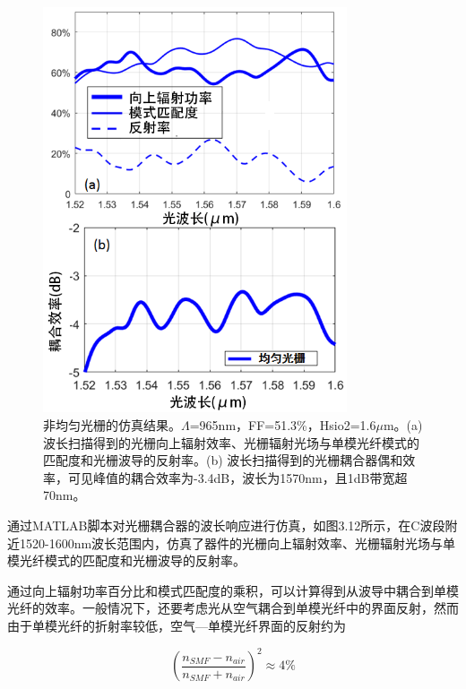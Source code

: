 \begin{figure}[!htbp]
    \centering
    \includegraphics[width=0.8\textwidth]{Img/3-12.png}
    \caption{非均匀光栅的仿真结果。$\Lambda$=965nm，FF=51.3\%，Hsio2=1.6$\mu$m。(a) 波长扫描得到的光栅向上辐射效率、光栅辐射光场与单模光纤模式的匹配度和光栅波导的反射率。(b) 波长扫描得到的光栅耦合器偶和效率，可见峰值的耦合效率为-3.4dB，波长为1570nm，且1dB带宽超70nm。}
    \label{fig:3-12}
\end{figure}

通过MATLAB脚本对光栅耦合器的波长响应进行仿真，如图3.12所示，在C波段附近1520-1600nm波长范围内，仿真了器件的光栅向上辐射效率、光栅辐射光场与单模光纤模式的匹配度和光栅波导的反射率。

通过向上辐射功率百分比和模式匹配度的乘积，可以计算得到从波导中耦合到单模光纤的效率。一般情况下，还要考虑光从空气耦合到单模光纤中的界面反射，然而由于单模光纤的折射率较低，空气—单模光纤界面的反射约为

\begin{equation}
\left( \frac{n_{SMF}-n_{air}}{n_{SMF}+n_{air}} \right)^2 \approx 4\%
\end{equation}


